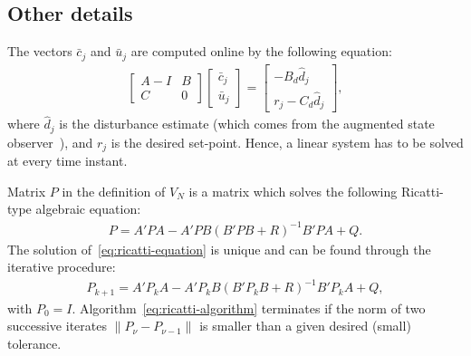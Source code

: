 \documentclass[12pt]{report}
\newcommand{\bcj}{\bar{c}_j}
\newcommand{\buj}{\bar{u}_j}
\begin{document}
\subsection*{Other details}
The vectors $\bcj$ and $\buj$ are computed online by
the following equation:
\begin{align}
\left[\begin{array}{cc}
A-I & B\\ C & 0
\end{array}\right]
\left[\begin{array}{c}
\bcj\\ 
\buj
\end{array}\right]=\left[\begin{array}{c}
-B_d \hat{d}_j\\
r_j - C_d \hat{d}_j
\end{array}\right],
\end{align}
where $\hat{d}_j$ is the disturbance estimate (which comes from
the augmented state observer~\cite[Eq. (24)]{SopPatSar14}),
and $r_j$ is the desired set-point. Hence, a linear system
has to be solved at every time instant.

Matrix $P$ in the definition of $V_N$ is a matrix which solves
the following Ricatti-type algebraic equation:
\begin{align}\label{eq:ricatti-equation}
P=A'PA - A'PB(B'PB+R)^{-1}B'PA+Q.
\end{align}
The solution of~\eqref{eq:ricatti-equation} is unique and can be 
found through the iterative procedure:
\begin{align}\label{eq:ricatti-algorithm}
P_{k+1}=A'P_kA - A'P_kB(B'P_kB+R)^{-1}B'P_kA+Q,
\end{align}
with $P_0=I$. Algorithm~\eqref{eq:ricatti-algorithm} terminates if the
norm of two successive iterates $\|P_{\nu}-P_{\nu-1}\|$ is smaller than 
a given desired (small) tolerance. 






\end{document}

